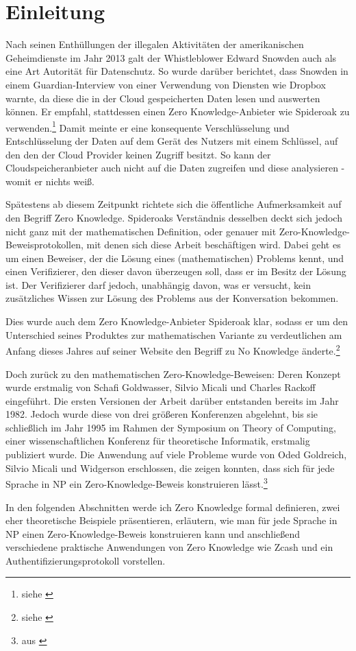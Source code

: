 \section{Einleitung}

Nach seinen Enthüllungen der illegalen Aktivitäten der amerikanischen Geheimdienste im Jahr 2013 galt der Whistleblower Edward Snowden auch als eine Art Autorität für Datenschutz. So wurde darüber berichtet, dass Snowden in einem Guardian-Interview von einer Verwendung von Diensten wie Dropbox warnte, da diese die in der Cloud gespeicherten Daten lesen und auswerten können. Er empfahl, stattdessen einen \glqq{}Zero Knowledge\grqq{}-Anbieter wie Spideroak zu verwenden.\footnote{siehe \cite{snowden}} Damit meinte er eine konsequente Verschlüsselung und Entschlüsselung der Daten auf dem Gerät des Nutzers mit einem Schlüssel, auf den den der Cloud Provider keinen Zugriff besitzt. So kann der Cloudspeicheranbieter auch nicht auf die Daten zugreifen und diese analysieren - womit er \glqq{}nichts weiß\grqq{}.

Spätestens ab diesem Zeitpunkt richtete sich die öffentliche Aufmerksamkeit auf den Begriff \glqq{}Zero Knowledge\grqq{}. Spideroaks Verständnis desselben deckt sich jedoch nicht ganz mit der mathematischen Definition, oder genauer mit Zero-Knowledge-Beweisprotokollen, mit denen sich diese Arbeit beschäftigen wird. Dabei geht es um einen Beweiser, der die Lösung eines (mathematischen) Problems kennt, und einen Verifizierer, den dieser davon überzeugen soll, dass er im Besitz der Lösung ist. Der Verifizierer darf jedoch, unabhängig davon, was er versucht, kein zusätzliches Wissen zur Lösung des Problems aus der Konversation bekommen. 

Dies wurde auch dem \glqq{}Zero Knowledge\grqq{}-Anbieter Spideroak klar, sodass er um den Unterschied seines Produktes zur mathematischen Variante zu verdeutlichen am Anfang dieses Jahres auf seiner Website den Begriff zu \glqq{}No Knowledge\grqq{} änderte.\footnote{siehe \cite{noknowledge}}

Doch zurück zu den mathematischen Zero-Knowledge-Beweisen: Deren Konzept wurde erstmalig von Schafi Goldwasser, Silvio Micali und Charles Rackoff eingeführt. Die ersten Versionen der Arbeit darüber entstanden bereits im Jahr 1982. Jedoch wurde diese von drei größeren Konferenzen abgelehnt, bis sie schließlich im Jahr 1995 im Rahmen der \glqq{}Symposium on Theory of Computing\grqq{}, einer wissenschaftlichen Konferenz für theoretische Informatik, erstmalig publiziert wurde. Die Anwendung auf viele Probleme wurde von Oded Goldreich, Silvio Micali und Widgerson erschlossen, die zeigen konnten, dass sich für jede Sprache in NP ein Zero-Knowledge-Beweis konstruieren lässt.\footnote{aus \cite[Seite 3]{20yearszeroknowledge}}

In den folgenden Abschnitten werde ich Zero Knowledge formal definieren, zwei eher theoretische Beispiele präsentieren, erläutern, wie man für jede Sprache in NP einen Zero-Knowledge-Beweis konstruieren kann und anschließend verschiedene praktische Anwendungen von Zero Knowledge wie Zcash und ein Authentifizierungsprotokoll vorstellen.

\pagebreak
